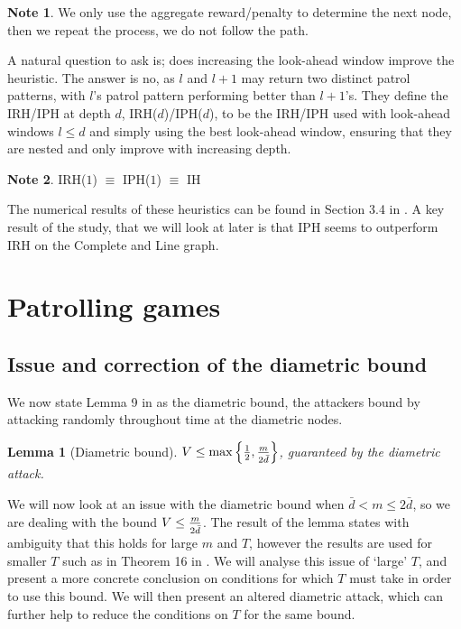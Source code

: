\documentclass[a4paper,10pt]{article}
\newtheorem{lemma}[theorem]{Lemma}
\theoremstyle{definition}
\theoremstyle{definition}
\theoremstyle{remark}
\theoremstyle{definition}
\newtheorem*{note}{Note}
\begin{document}
\begin{note}
We only use the aggregate reward/penalty to determine the next node, then we repeat the process, we do not follow the path.
\end{note}

A natural question to ask is; does increasing the look-ahead window improve the heuristic. The answer is no, as $l$ and $l+1$ may return two distinct patrol patterns, with $l$'s patrol pattern performing better than $l+1$'s. They define the IRH/IPH at depth $d$, IRH($d$)/IPH($d$), to be the IRH/IPH used with look-ahead windows $l \leq d$ and simply using the best look-ahead window, ensuring that they are nested and only improve with increasing depth.

\begin{note}
IRH($1$) $\equiv$ IPH($1$) $\equiv$ IH
\end{note}

The numerical results of these heuristics can be found in Section 3.4 in \citep{Lin2013}. A key result of the study, that we will look at later is that IPH seems to outperform IRH on the Complete and Line graph.

\section{Patrolling games}
\label{Section:Patrolling games}

\subsection{Issue and correction of the diametric bound}
\label{Section:Issue and correction of the diametric bound}
We now state Lemma 9 in \cite{Alpern2011} as the diametric bound, the attackers bound by attacking randomly throughout time at the diametric nodes.

\begin{lemma}[Diametric bound]
$V \leq \max \left\{ \frac{1}{2},\frac{m}{\raisebox{-0.5ex}{$\scriptstyle 2 \bar{d}$}} \right\}$, guaranteed by the diametric attack.
\end{lemma}

We will now look at an issue with the diametric bound when $\bar{d} < m \leq 2 \bar{d}$, so we are dealing with the bound $V \leq \frac{m}{\raisebox{-0.5ex}{$\scriptstyle 2 \bar{d}$}}$. The result of the lemma states with ambiguity that this holds for large $m$ and $T$, however the results are used for smaller $T$ such as in Theorem 16 in \citep{Alpern2011}. We will analyse this issue of `large' $T$,  and present a more concrete conclusion on conditions for which $T$ must take in order to use this bound. We will then present an altered diametric attack, which can further help to reduce the conditions on $T$ for the same bound.
\end{document}
